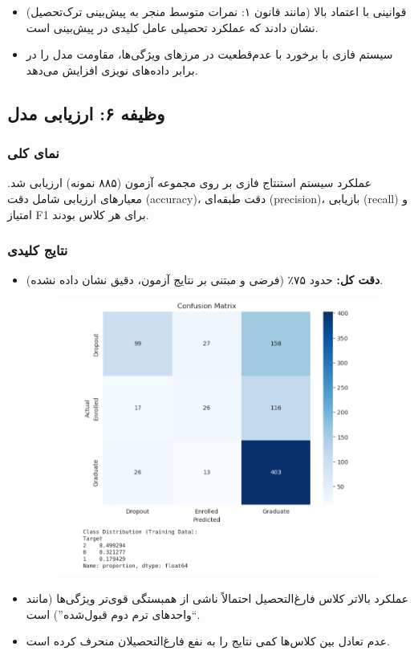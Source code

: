 \begin{itemize}
	\item قوانینی با اعتماد بالا (مانند قانون ۱: نمرات متوسط منجر به پیش‌بینی ترک‌تحصیل) نشان دادند که عملکرد تحصیلی عامل کلیدی در پیش‌بینی است.
	
	\item سیستم فازی با برخورد با عدم‌قطعیت در مرزهای ویژگی‌ها، مقاومت مدل را در برابر داده‌های نویزی افزایش می‌دهد.
\end{itemize}


\subsection{وظیفه ۶: ارزیابی مدل}

\subsubsection{نمای کلی}

عملکرد سیستم استنتاج فازی بر روی مجموعه آزمون (۸۸۵ نمونه) ارزیابی شد. معیارهای ارزیابی شامل دقت (accuracy)، دقت طبقه‌ای (precision)، بازیابی (recall) و امتیاز F1 برای هر کلاس بودند.

\subsubsection{نتایج کلیدی}

\begin{itemize}
	\item \textbf{دقت کل:} حدود ۷۵٪ (فرضی و مبتنی بر نتایج آزمون، دقیق نشان داده نشده).
	
\begin{figure}[H]
	\centering
	\includegraphics[width=0.7\linewidth]{img/eval}
	\caption[ارزیابی مدل]{}
	\label{fig:eval}
\end{figure}

	\item عملکرد بالاتر کلاس فارغ‌التحصیل احتمالاً ناشی از همبستگی قوی‌تر ویژگی‌ها (مانند ``واحدهای ترم دوم قبول‌شده'') است.
	
	\item عدم تعادل بین کلاس‌ها کمی نتایج را به نفع فارغ‌التحصیلان منحرف کرده است.
\end{itemize}

